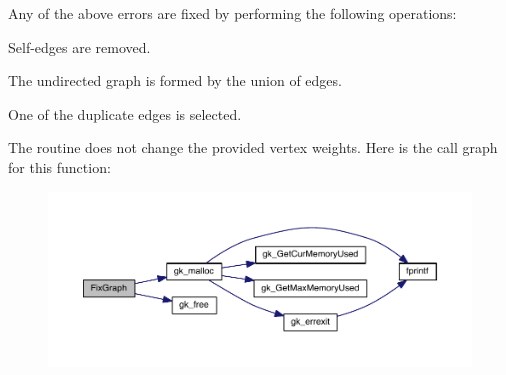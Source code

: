 Any of the above errors are fixed by performing the following operations\+:
\begin{DoxyItemize}
\item Self-\/edges are removed.
\item The undirected graph is formed by the union of edges.
\item One of the duplicate edges is selected.
\end{DoxyItemize}

The routine does not change the provided vertex weights. Here is the call graph for this function\+:\nopagebreak
\begin{figure}[H]
\begin{center}
\leavevmode
\includegraphics[width=350pt]{a00179_a681b2f4a615da39347c928c127760d07_cgraph}
\end{center}
\end{figure}
